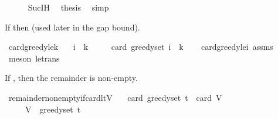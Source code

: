 \begin{isabellebody}
\ \ \ \ \isamarkupfalse%
\ Suc{\isachardot}{\kern0pt}IH\ \isamarkupfalse%
\ {\isacharquery}{\kern0pt}thesis\ \isamarkupfalse%
\ simp\isanewline
\ \ \isamarkupfalse%
\isanewline
{}\isamarkupfalse%
%
\endisatagproof
{\isafoldproof}%
%
\isadelimproof
%
\endisadelimproof
%
\begin{isamarkuptext}%
If  then  (used later in the gap bound).%
\end{isamarkuptext}\isamarkuptrue%
\isamarkupfalse%
\ card{\isacharunderscore}{\kern0pt}greedy{\isacharunderscore}{\kern0pt}le{\isacharunderscore}{\kern0pt}k{\isacharcolon}{\kern0pt}\isanewline
\ \ \ {\isachardoublequoteopen}i\ {\isasymle}\ k{\isachardoublequoteclose}\isanewline
\ \ \ \ \ {\isachardoublequoteopen}card\ {\isacharparenleft}{\kern0pt}greedy{\isacharunderscore}{\kern0pt}set\ i{\isacharparenright}{\kern0pt}\ {\isasymle}\ k{\isachardoublequoteclose}\isanewline
%
\isadelimproof
\ \ %
\endisadelimproof
%
\isatagproof
{}\isamarkupfalse%
\ card{\isacharunderscore}{\kern0pt}greedy{\isacharunderscore}{\kern0pt}le{\isacharunderscore}{\kern0pt}i\ assms\ \isamarkupfalse%
\ {\isacharparenleft}{\kern0pt}meson\ le{\isacharunderscore}{\kern0pt}trans{\isacharparenright}{\kern0pt}%
\endisatagproof
{\isafoldproof}%
%
\isadelimproof
%
\endisadelimproof
%
\begin{isamarkuptext}%
If , then the remainder 
  is non-empty.%
\end{isamarkuptext}\isamarkuptrue%
\isamarkupfalse%
\ remainder{\isacharunderscore}{\kern0pt}nonempty{\isacharunderscore}{\kern0pt}if{\isacharunderscore}{\kern0pt}card{\isacharunderscore}{\kern0pt}ltV{\isacharcolon}{\kern0pt}\isanewline
\ \ \ {\isachardoublequoteopen}card\ {\isacharparenleft}{\kern0pt}greedy{\isacharunderscore}{\kern0pt}set\ t{\isacharparenright}{\kern0pt}\ {\isacharless}{\kern0pt}\ card\ V{\isachardoublequoteclose}\isanewline
\ \ \ \ \ {\isachardoublequoteopen}V\ {\isacharminus}{\kern0pt}\ greedy{\isacharunderscore}{\kern0pt}set\ t\ {\isasymnoteq}\ {\isacharbraceleft}{\kern0pt}{\isacharbraceright}{\kern0pt}{\isachardoublequoteclose}\isanewline

\end{isabellebody}
